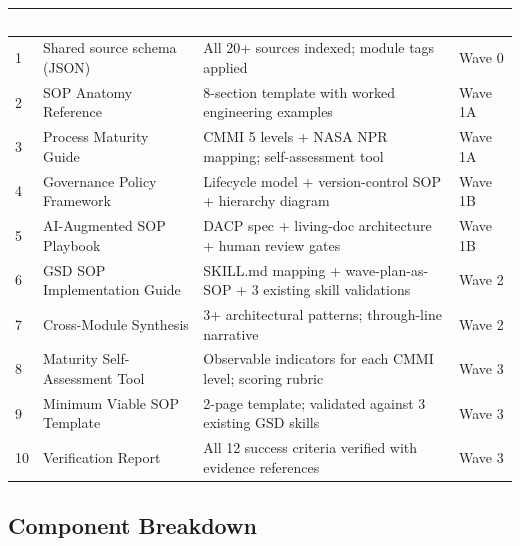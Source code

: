 \documentclass[11pt,letterpaper]{article}
\newcommand{\tableheader}[1]{\textbf{\sffamily\textcolor{white}{#1}}}
\begin{document}
\begin{center}
\begin{tabularx}{\textwidth}{L{0.5cm}L{4cm}XL{2cm}}
\toprule
{}
\tableheader{\#} & \tableheader{Deliverable} & \tableheader{Acceptance Criteria} & \tableheader{Wave} \\
 & Shared source schema (JSON) & All 20+ sources indexed; module tags applied & Wave 0 \\
2 & SOP Anatomy Reference & 8-section template with worked engineering examples & Wave 1A \\
3 & Process Maturity Guide & CMMI 5 levels + NASA NPR mapping; self-assessment tool & Wave 1A \\
4 & Governance Policy Framework & Lifecycle model + version-control SOP + hierarchy diagram & Wave 1B \\
5 & AI-Augmented SOP Playbook & DACP spec + living-doc architecture + human review gates & Wave 1B \\
6 & GSD SOP Implementation Guide & SKILL.md mapping + wave-plan-as-SOP + 3 existing skill validations & Wave 2 \\
7 & Cross-Module Synthesis & 3+ architectural patterns; through-line narrative & Wave 2 \\
8 & Maturity Self-Assessment Tool & Observable indicators for each CMMI level; scoring rubric & Wave 3 \\
9 & Minimum Viable SOP Template & 2-page template; validated against 3 existing GSD skills & Wave 3 \\
10 & Verification Report & All 12 success criteria verified with evidence references & Wave 3 \\
\bottomrule
\end{tabularx}
\end{center}

\subsection{Component Breakdown}
\end{document}
